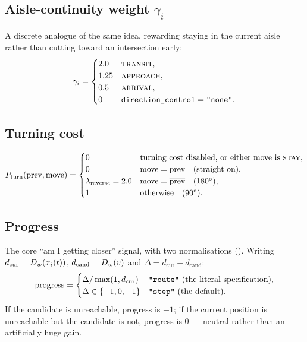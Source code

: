 \subsection{Aisle-continuity weight \texorpdfstring{$\gamma_i$}{gamma}}
\label{sec:score-gamma}

A discrete analogue of the same idea, rewarding staying in the current aisle
rather than cutting toward an intersection early:
\begin{equation}
  \gamma_i =
  \begin{cases}
    2.0 & \textsc{transit},\\
    1.25 & \textsc{approach},\\
    0.5 & \textsc{arrival},\\
    0 & \texttt{direction\_control} = \texttt{"none"}.
  \end{cases}
\end{equation}

\subsection{Turning cost}
\label{sec:score-turn}

\begin{equation}
  P_{\mathrm{turn}}(\text{prev}, \text{move}) =
  \begin{cases}
    0 & \text{turning cost disabled, or either move is \textsc{stay}},\\
    0 & \text{move} = \text{prev} \quad \text{(straight on)},\\
    \lambda_{\mathrm{reverse}} = 2.0 & \text{move} = \overline{\text{prev}} \quad (180^\circ),\\
    1 & \text{otherwise} \quad (90^\circ).
  \end{cases}
\end{equation}

\subsection{Progress}
\label{sec:score-progress}

The core ``am I getting closer'' signal, with two normalisations
(). Writing $d_{\mathrm{cur}} =
D_{w}(x_{i}(t))$, $d_{\mathrm{cand}} = D_{w}(v)$ and
$\Delta = d_{\mathrm{cur}} - d_{\mathrm{cand}}$:
\begin{equation}
  \mathrm{progress} =
  \begin{cases}
    \Delta / \max(1, d_{\mathrm{cur}}) & \text{\texttt{"route"} (the literal specification)},\\
    \Delta \in \{-1, 0, +1\} & \text{\texttt{"step"} (the default)}.
  \end{cases}
\end{equation}
If the candidate is unreachable, progress is $-1$; if the current position is
unreachable but the candidate is not, progress is $0$ --- neutral rather than
an artificially huge gain.

